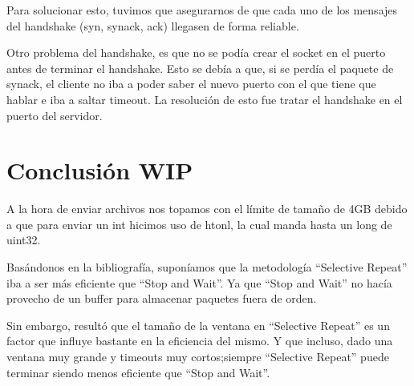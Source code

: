 \documentclass{article}
\begin{document}
Para solucionar esto, tuvimos que asegurarnos de que cada uno de los mensajes del handshake (syn, synack, ack) llegasen de forma reliable.

Otro problema del handshake, es que no se podía crear el socket en el puerto antes de terminar el handshake. Esto se debía a que, si se perdía el paquete de synack, el cliente no iba a poder saber el nuevo puerto con el que tiene que hablar e iba a saltar timeout. La resolución de esto fue tratar el handshake en el puerto del servidor.

\section{\texorpdfstring{\textbf{Conclusión
WIP}}{Conclusión}}\label{conclusiuxf3n-wip}

A la hora de enviar archivos nos topamos con el límite de tamaño de 4GB debido a que para enviar un int hicimos uso de htonl, la cual manda hasta un long de uint32.



Basándonos en la bibliografía, suponíamos que la metodología ``Selective Repeat'' iba a ser más eficiente que ``Stop and Wait''. Ya que ``Stop and Wait'' no hacía provecho de un buffer para almacenar paquetes fuera de orden.

Sin embargo, resultó que el tamaño de la ventana en ``Selective Repeat'' es un factor que influye bastante en la eficiencia del mismo. Y que incluso, dado una ventana muy grande y timeouts muy cortos;siempre ``Selective Repeat'' puede terminar siendo menos eficiente que ``Stop and Wait''.
\end{document}
